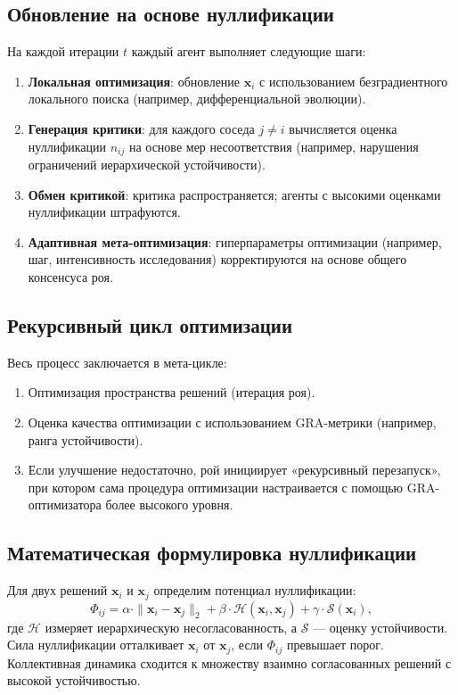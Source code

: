 \documentclass[12pt,a4paper]{article}
\begin{document}
\subsection{Обновление на основе нуллификации}
На каждой итерации $t$ каждый агент выполняет следующие шаги:
\begin{enumerate}
    \item \textbf{Локальная оптимизация}: обновление $\mathbf{x}_i$ с использованием безградиентного локального поиска (например, дифференциальной эволюции).
    \item \textbf{Генерация критики}: для каждого соседа $j \neq i$ вычисляется оценка нуллификации $n_{ij}$ на основе мер несоответствия (например, нарушения ограничений иерархической устойчивости).
    \item \textbf{Обмен критикой}: критика распространяется; агенты с высокими оценками нуллификации штрафуются.
    \item \textbf{Адаптивная мета-оптимизация}: гиперпараметры оптимизации (например, шаг, интенсивность исследования) корректируются на основе общего консенсуса роя.
\end{enumerate}

\subsection{Рекурсивный цикл оптимизации}
Весь процесс заключается в мета-цикле:
\begin{enumerate}
    \item Оптимизация пространства решений (итерация роя).
    \item Оценка качества оптимизации с использованием GRA-метрики (например, ранга устойчивости).
    \item Если улучшение недостаточно, рой инициирует «рекурсивный перезапуск», при котором сама процедура оптимизации настраивается с помощью GRA-оптимизатора более высокого уровня.
\end{enumerate}

\subsection{Математическая формулировка нуллификации}
Для двух решений $\mathbf{x}_i$ и $\mathbf{x}_j$ определим потенциал нуллификации:
\[
\Phi_{ij} = \alpha \cdot \|\mathbf{x}_i - \mathbf{x}_j\|_2 + \beta \cdot \mathcal{H}(\mathbf{x}_i, \mathbf{x}_j) + \gamma \cdot \mathcal{S}(\mathbf{x}_i),
\]
где $\mathcal{H}$ измеряет иерархическую несогласованность, а $\mathcal{S}$ — оценку устойчивости. Сила нуллификации отталкивает $\mathbf{x}_i$ от $\mathbf{x}_j$, если $\Phi_{ij}$ превышает порог. Коллективная динамика сходится к множеству взаимно согласованных решений с высокой устойчивостью.
\end{document}
